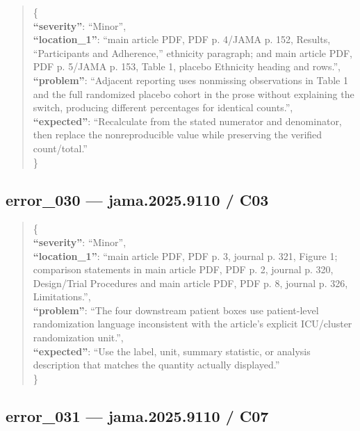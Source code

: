 \documentclass[
  letterpaper,
  9pt]{extreport}
\begin{document}
\begin{quote}
\{\\
\textbf{``severity''}: ``Minor'',\\
\textbf{``location\_1''}: ``main article PDF, PDF p. 4/JAMA p. 152,
Results, ``Participants and Adherence,'' ethnicity paragraph; and main
article PDF, PDF p. 5/JAMA p. 153, Table 1, placebo Ethnicity heading
and rows.'',\\
\textbf{``problem''}: ``Adjacent reporting uses nonmissing observations
in Table 1 and the full randomized placebo cohort in the prose without
explaining the switch, producing different percentages for identical
counts.'',\\
\textbf{``expected''}: ``Recalculate from the stated numerator and
denominator, then replace the nonreproducible value while preserving the
verified count/total.''\\
\}
\end{quote}

\hypertarget{error_030--jama20259110--c03}{%
\subsection{error\_030 --- jama.2025.9110 /
C03}\label{error_030--jama20259110--c03}}

\begin{quote}
\{\\
\textbf{``severity''}: ``Minor'',\\
\textbf{``location\_1''}: ``main article PDF, PDF p. 3, journal p. 321,
Figure 1; comparison statements in main article PDF, PDF p. 2, journal
p. 320, Design/Trial Procedures and main article PDF, PDF p. 8, journal
p. 326, Limitations.'',\\
\textbf{``problem''}: ``The four downstream patient boxes use
patient-level randomization language inconsistent with the article's
explicit ICU/cluster randomization unit.'',\\
\textbf{``expected''}: ``Use the label, unit, summary statistic, or
analysis description that matches the quantity actually displayed.''\\
\}
\end{quote}

\hypertarget{error_031--jama20259110--c07}{%
\subsection{error\_031 --- jama.2025.9110 /
C07}\label{error_031--jama20259110--c07}}
\end{document}
